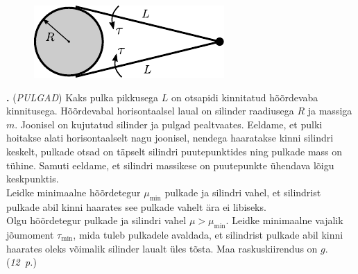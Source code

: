 \documentclass[11pt,a5paper]{article}
\newcommand{\numb}[1]{\vspace{5pt}\textbf{\large #1}}
\newcommand{\nimi}[1]{(\textsl{\small #1})}
\newcommand{\punktid}[1]{(\emph{#1~p.})}
\newcounter{ylesanne}
\newcommand{\yl}[1]{\addtocounter{ylesanne}{1}\numb{\theylesanne.} \nimi{#1} \newblock{}}
\begin{document}
\begin{figure}
  \vspace{-8pt}
  \begin{center}
  \includegraphics[scale=0.9]{pulgad_joon.pdf}
  \end{center}
  \vspace{-25pt}
\end{figure}
\yl{PULGAD}
Kaks pulka pikkusega $L$ on otsapidi kinnitatud hõõrdevaba kinnitusega.
Hõõrdevabal horisontaalsel laual on silinder raadiusega $R$ ja massiga $m$.
Joonisel on kujutatud silinder ja pulgad pealtvaates. Eeldame, et pulki hoitakse
alati horisontaalselt nagu joonisel, nendega haaratakse kinni silindri keskelt,
pulkade otsad on täpselt silindri puutepunktides ning pulkade mass on tühine.
Samuti eeldame, et silindri massikese on puutepunkte ühendava lõigu keskpunktis.\\
\osa Leidke minimaalne hõõrdetegur $\mu_{\min}$ pulkade ja silindri vahel,
et silindrist pulkade abil kinni haarates see pulkade vahelt ära ei libiseks.\\
\osa Olgu hõõrdetegur pulkade ja silindri vahel $\mu > \mu_{\min}$. Leidke
minimaalne vajalik jõumoment $\tau_{\min}$, mida tuleb pulkadele avaldada, et
silindrist pulkade abil kinni haarates oleks võimalik silinder laualt üles
tõsta. Maa raskuskiirendus on $g$.
\punktid{12}
\end{document}
